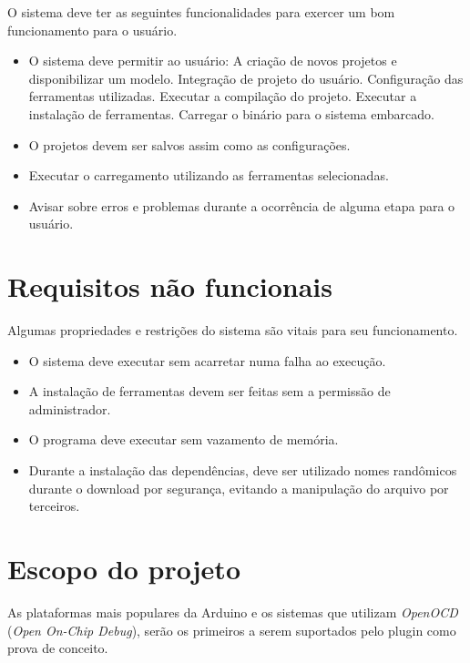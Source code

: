 O sistema deve ter as seguintes funcionalidades para exercer um bom funcionamento para o usuário.
\begin{itemize}
\item O sistema deve permitir ao usuário:
	\subitem A criação de novos projetos e disponibilizar um modelo.
	\subitem Integração de projeto do usuário.
    \subitem Configuração das ferramentas utilizadas.
	\subitem Executar a compilação do projeto.
	\subitem Executar a instalação de ferramentas.
	\subitem Carregar o binário para o sistema embarcado.
\item O projetos devem ser salvos assim como as configurações.
\item Executar o carregamento utilizando as ferramentas selecionadas.
\item Avisar sobre erros e problemas durante a ocorrência de alguma etapa para o usuário.	
\end{itemize}

\section{Requisitos não funcionais}
Algumas propriedades e restrições do sistema são vitais para seu funcionamento.
\begin{itemize}
\item O sistema deve executar sem acarretar numa falha ao execução.
\item A instalação de ferramentas devem ser feitas sem a permissão de administrador.
\item O programa deve executar sem vazamento de memória.
\item Durante a instalação das dependências, deve ser utilizado nomes randômicos durante o download por segurança, evitando a manipulação do arquivo por terceiros.
\end{itemize}

\section{Escopo do projeto}
As plataformas mais populares da Arduino e os sistemas que utilizam \textit{OpenOCD} (\textit{Open On-Chip Debug}), serão os primeiros a serem suportados pelo plugin como prova de conceito.

